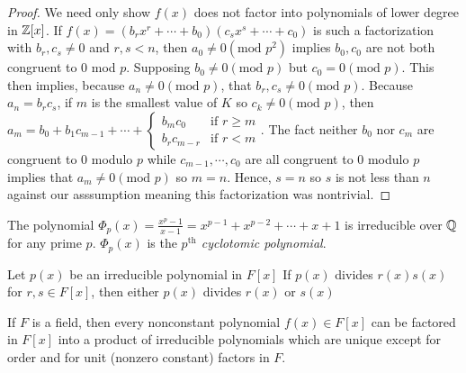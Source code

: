 \begin{proof}
    We need only show $f(x)$ does not factor into polynomials of lower degree in $\mathbb{Z}[x]$. If $f(x) = (b_rx^r + \cdots + b_0)(c_sx^s + \cdots + c_0)$ is such a factorization with $b_r, c_s \neq 0$ and $r,s < n$, then $a_0 \neq 0 (\text{mod } p^2)$ implies $b_0, c_0$ are not both congruent to 0 mod $p$. Supposing $b_0 \neq 0 (\text{mod } p)$ but $c_0 = 0 (\text{mod } p)$. This then implies, because $a_n \neq 0 (\text{mod } p)$, that $b_r, c_s \neq 0 (\text{mod } p)$. Because $a_n = b_rc_s$, if $m$ is the smallest value of $K$ so $c_k \neq 0 (\text{mod } p)$, then $a_m = b_0 + b_1c_{m-1} + \cdots + \begin{cases} b_mc_0 & \text{if } r \geq m \\ b_rc_{m-r} & \text{if } r < m\end{cases}.$ The fact neither $b_0$ nor $c_m$ are congruent to 0 modulo $p$ while $c_{m-1},\cdots, c_0$ are all congruent to 0 modulo $p$ implies that $a_m \neq 0 (\text{mod } p)$ so $m = n$. Hence, $s = n$ so $s$ is not less than $n$ against our asssumption meaning this factorization was nontrivial. 
\end{proof}
\begin{corollary}
    The polynomial $\Phi_p(x) = \frac{x^p-1}{x-1} = x^{p-1} + x^{p-2} + \cdots + x + 1$ is irreducible over $\mathbb{Q}$ for any prime $p$. $\Phi_p(x)$ is the \emph{$p^{\text{th}}$ cyclotomic polynomial}.
\end{corollary}
\begin{theorem}
    Let $p(x)$ be an irreducible polynomial in $F[x]$ If $p(x)$ divides $r(x)s(x)$ for $r,s \in F[x]$, then either $p(x)$ divides $r(x)$ or $s(x)$
\end{theorem}
\begin{theorem}
    If $F$ is a field, then every nonconstant polynomial $f(x) \in F[x]$ can be factored in $F[x]$ into a product of irreducible polynomials which are unique except for order and for unit (nonzero constant) factors in $F$.
\end{theorem}

